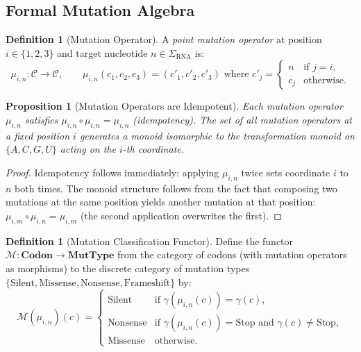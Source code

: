 \documentclass[12pt,a4paper]{article}
\newtheorem{proposition}[theorem]{Proposition}
\theoremstyle{definition}
\newtheorem{definition}[theorem]{Definition}
\newcommand{\cat}[1]{\mathbf{#1}}
\begin{document}
\subsection{Formal Mutation Algebra}

\begin{definition}[Mutation Operator]\label{def:mutation-operator}
A \emph{point mutation operator} at position $i \in \{1,2,3\}$ and target nucleotide $n \in \Sigma_\mathrm{RNA}$ is:
\[
  \mu_{i,n} \colon \mathcal{C} \to \mathcal{C}, \qquad
  \mu_{i,n}(c_1, c_2, c_3) = (c'_1, c'_2, c'_3) \text{ where } c'_j = \begin{cases} n & \text{if } j = i, \\ c_j & \text{otherwise.} \end{cases}
\]
\end{definition}

\begin{proposition}[Mutation Operators are Idempotent]\label{prop:idempotent}
Each mutation operator $\mu_{i,n}$ satisfies $\mu_{i,n} \circ \mu_{i,n} = \mu_{i,n}$ (idempotency). The set of all mutation operators at a fixed position $i$ generates a monoid isomorphic to the transformation monoid on $\{A, C, G, U\}$ acting on the $i$-th coordinate.
\end{proposition}

\begin{proof}
Idempotency follows immediately: applying $\mu_{i,n}$ twice sets coordinate $i$ to $n$ both times. The monoid structure follows from the fact that composing two mutations at the same position yields another mutation at that position: $\mu_{i,m} \circ \mu_{i,n} = \mu_{i,m}$ (the second application overwrites the first).
\end{proof}

\begin{definition}[Mutation Classification Functor]\label{def:mutation-functor}
Define the functor $\mathcal{M} \colon \cat{Codon} \to \cat{MutType}$ from the category of codons (with mutation operators as morphisms) to the discrete category of mutation types $\{\text{Silent}, \text{Missense}, \text{Nonsense}, \text{Frameshift}\}$ by:
\[
  \mathcal{M}(\mu_{i,n})(c) = \begin{cases}
    \text{Silent}   & \text{if } \gamma(\mu_{i,n}(c)) = \gamma(c), \\
    \text{Nonsense} & \text{if } \gamma(\mu_{i,n}(c)) = \text{Stop} \text{ and } \gamma(c) \neq \text{Stop}, \\
    \text{Missense} & \text{otherwise.}
  \end{cases}
\]
\end{definition}
\end{document}
